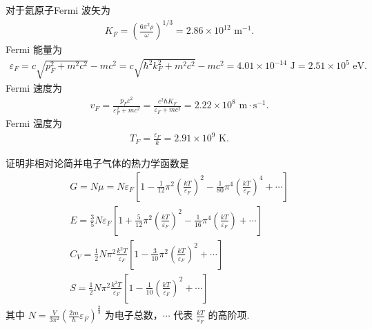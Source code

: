 \documentclass{assignment}
\begin{document}
\begin{sol}
\begin{itemize}
        对于氦原子Fermi 波矢为
        \begin{align}
            K_F=\left(\frac{6\pi^2\rho}{\omega}\right)^{1/3}=2.86\times 10^{12}\text{ m}^{-1}.
        \end{align}
        Fermi 能量为
        \begin{align}
            \varepsilon_F=c\sqrt{p_F^2+m^2c^2}-mc^2=c\sqrt{\hbar^2k_F^2+m^2c^2}-mc^2=4.01\times 10^{-14}\text{ J}=2.51\times 10^5\text{ eV}.
        \end{align}
        Fermi 速度为
        \begin{align}
            v_F=\frac{p_Fc^2}{\varepsilon_F^2+mc^2}=\frac{c^2\hbar K_F}{\varepsilon_F+mc^2}=2.22\times 10^8\text{ m}\cdot\text{s}^{-1}.
        \end{align}
        Fermi 温度为
        \begin{align}
            T_F=\frac{\varepsilon_F}{k}=2.91\times 10^9\text{ K}.
        \end{align}
    \end{itemize}
\end{sol}

\begin{prob}
    证明非相对论简并电子气体的热力学函数是
    \begin{gather*}
        G=N\mu=N\varepsilon_F\left[1-\frac{1}{12}\pi^2\left(\frac{kT}{\varepsilon_F}\right)^2-\frac{1}{80}\pi^4\left(\frac{kT}{\varepsilon_F}\right)^4+\cdots\right]\\
        E=\frac{3}{5}N\varepsilon_F\left[1+\frac{5}{12}\pi^2\left(\frac{kT}{\varepsilon_F}\right)^2-\frac{1}{16}\pi^4\left(\frac{kT}{\varepsilon_F}\right)+\cdots\right]\\
        C_V=\frac{1}{2}N\pi^2\frac{k^2T}{\varepsilon_F}\left[1-\frac{3}{10}\pi^2\left(\frac{kT}{\varepsilon_F}\right)^2+\cdots\right]\\
        S=\frac{1}{2}N\pi^2\frac{k^2T}{\varepsilon_F}\left[1-\frac{1}{10}\left(\frac{kT}{\varepsilon_F}\right)^2+\cdots\right]
    \end{gather*}
    其中 $N=\frac{V}{3\pi^2}\left(\frac{2m}{\hbar}\varepsilon_F\right)^{\frac{2}{3}}$ 为电子总数，$\cdots$ 代表 $\frac{kT}{\varepsilon_F}$ 的高阶项.
\end{prob}
\begin{pf}
    
\end{pf}
\end{document}
